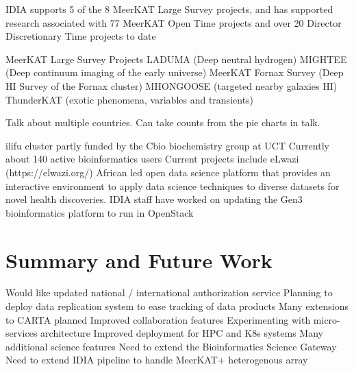 \documentclass[12pt,twocolumn,a4paper]{article}
\begin{document}
IDIA supports 5 of the 8 MeerKAT Large Survey projects, and has supported research associated with 77 MeerKAT Open Time projects and over 20 Director Discretionary Time projects to date

MeerKAT Large Survey Projects
LADUMA (Deep neutral hydrogen)
MIGHTEE (Deep continuum imaging of the early universe)
MeerKAT Fornax Survey (Deep HI Survey of the Fornax cluster)
MHONGOOSE (targeted nearby galaxies HI)
ThunderKAT (exotic phenomena, variables and transients)

Talk about multiple countries.
Can take counts from the pie charts in talk.

ilifu cluster partly funded by the Cbio biochemistry group at UCT
Currently about 140 active bioinformatics users
Current projects include eLwazi (https://elwazi.org/)
African led open data science platform that provides an interactive environment to apply data science techniques to diverse datasets for novel health discoveries.
IDIA staff have worked on updating the Gen3 bioinformatics platform to run in OpenStack


\section{Summary and Future Work}
\label{sec:conclusions}

Would like updated national / international authorization service
Planning to deploy data replication system to ease tracking of data products
Many extensions to CARTA planned
Improved collaboration features
Experimenting with micro-services architecture
Improved deployment for HPC and K8s systems
Many additional science features
Need to extend the Bioinformatics Science Gateway
Need to extend IDIA pipeline to handle MeerKAT+ heterogenous array
\end{document}
